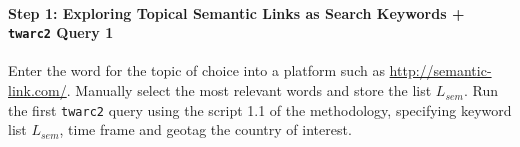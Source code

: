         \paragraph{Step 1: Exploring Topical Semantic Links as Search Keywords + \texttt{twarc2} Query 1} 
        
        \newline\indent
        
        Enter the word for the topic of choice into a platform such as \url{http://semantic-link.com/}. Manually select the most relevant words and store the list $L_{sem}$. Run the first \texttt{twarc2} query using the script 1.1 of the methodology, specifying keyword list $L_{sem}$, time frame and geotag the country of interest. %

        

            


